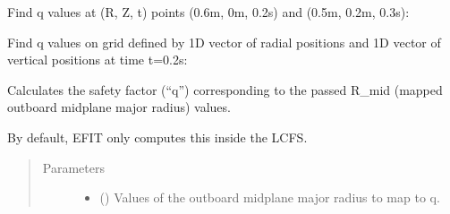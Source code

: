 \documentclass[letterpaper,10pt,english]{sphinxmanual}
\begin{document}
\begin{fulllineitems}
\begin{fulllineitems}
Find q values at (R, Z, t) points (0.6m, 0m, 0.2s) and (0.5m, 0.2m, 0.3s):

\begin{sphinxVerbatim}[commandchars=\\\{\}]
  \PYG{p}{[} \PYG{p}{]} \PYG{p}{[} \PYG{p}{]} \PYG{p}{[} \PYG{p}{]} 
\end{sphinxVerbatim}

Find q values on grid defined by 1D vector of radial positions 
and 1D vector of vertical positions  at time t=0.2s:

\begin{sphinxVerbatim}[commandchars=\\\{\}]
     
\end{sphinxVerbatim}

\end{fulllineitems}


\begin{fulllineitems}
\label{\detokenize{eqtools:eqtools.core.Equilibrium.rmid2q}}
Calculates the safety factor (“q”) corresponding to the passed R\_mid (mapped outboard midplane major radius) values.

By default, EFIT only computes this inside the LCFS.
\begin{quote}\begin{description}
\item[{Parameters}] \leavevmode\begin{itemize}
\item {} 
 () \textendash{} Values of the outboard midplane
major radius to map to q.


\end{itemize}
\end{description}
\end{quote}
\end{fulllineitems}
\end{fulllineitems}
\end{document}

